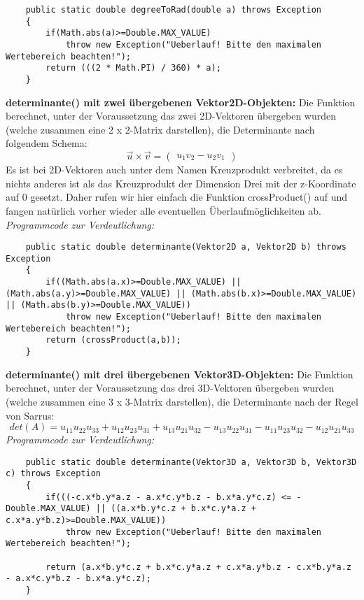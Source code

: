 \documentclass[a4paper,11pt]{scrartcl}
\begin{document}
\begin{lstlisting}
	public static double degreeToRad(double a) throws Exception
	{
		if(Math.abs(a)>=Double.MAX_VALUE)
			throw new Exception("Ueberlauf! Bitte den maximalen Wertebereich beachten!");
		return (((2 * Math.PI) / 360) * a);
	}
\end{lstlisting} $\;$ \\
\textbf{determinante() mit zwei übergebenen Vektor2D-Objekten:} Die Funktion  berechnet, unter der Voraussetzung das zwei 2D-Vektoren übergeben wurden (welche zusammen eine 2 x 2-Matrix darstellen), die Determinante nach folgendem Schema:
\[ \vec u \times \vec v = \begin{pmatrix}
u_1v_2 - u_2v_1
\end{pmatrix}\]
Es ist bei 2D-Vektoren auch unter dem Namen Kreuzprodukt verbreitet, da es nichts anderes ist als das Kreuzprodukt der Dimension Drei mit der z-Koordinate auf 0 gesetzt. Daher rufen wir hier einfach die Funktion crossProduct() auf und fangen natürlich vorher wieder alle eventuellen Überlaufmöglichkeiten ab.\\
\textit{Programmcode zur Verdeutlichung:}
\begin{lstlisting}
	public static double determinante(Vektor2D a, Vektor2D b) throws Exception
	{
		if((Math.abs(a.x)>=Double.MAX_VALUE) || (Math.abs(a.y)>=Double.MAX_VALUE) || (Math.abs(b.x)>=Double.MAX_VALUE) || (Math.abs(b.y)>=Double.MAX_VALUE))
			throw new Exception("Ueberlauf! Bitte den maximalen Wertebereich beachten!");
		return (crossProduct(a,b));
	}
\end{lstlisting} $\;$ \\
\textbf{determinante() mit drei übergebenen Vektor3D-Objekten:} Die Funktion  berechnet, unter der Voraussetzung das drei 3D-Vektoren übergeben wurden (welche zusammen eine 3 x 3-Matrix darstellen), die Determinante nach der Regel von Sarrus:
\[ det(A) = u_{11}u_{22}u_{33} + u_{12}u_{23}u_{31} + u_{13}u_{21}u_{32} - u_{13}u_{22}u_{31} - u_{11}u_{23}u_{32} - u_{12}u_{21}u_{33} \]
\textit{Programmcode zur Verdeutlichung:}
\begin{lstlisting}
	public static double determinante(Vektor3D a, Vektor3D b, Vektor3D c) throws Exception
	{
		if(((-c.x*b.y*a.z - a.x*c.y*b.z - b.x*a.y*c.z) <= -Double.MAX_VALUE) || ((a.x*b.y*c.z + b.x*c.y*a.z + c.x*a.y*b.z)>=Double.MAX_VALUE))
			throw new Exception("Ueberlauf! Bitte den maximalen Wertebereich beachten!");
		
		return (a.x*b.y*c.z + b.x*c.y*a.z + c.x*a.y*b.z - c.x*b.y*a.z - a.x*c.y*b.z - b.x*a.y*c.z);
	}
\end{lstlisting}
\end{document}
